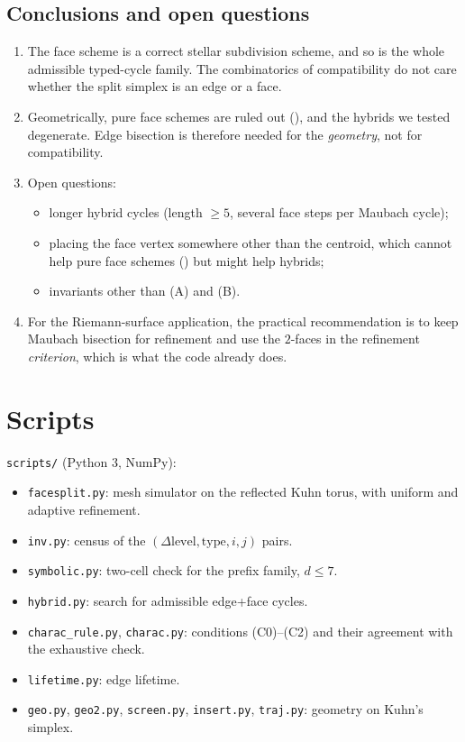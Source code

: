 \documentclass[11pt]{article}
\theoremstyle{plain}
\theoremstyle{definition}
\theoremstyle{remark}
\newcommand{\type}{\mathrm{type}}
\newcommand{\level}{\mathrm{level}}
\begin{document}
\subsection{Conclusions and open questions}

\begin{enumerate}
\item The face scheme is a correct stellar subdivision scheme, and so is
  the whole admissible typed-cycle family. The combinatorics of
  compatibility do not care whether the split simplex is an edge or a
  face.
\item Geometrically, pure face schemes are ruled out
  (), and the hybrids we tested degenerate. Edge
  bisection is therefore needed for the \emph{geometry}, not for
  compatibility.
\item Open questions:
  \begin{itemize}
  \item longer hybrid cycles (length $\ge5$, several face steps per
    Maubach cycle);
  \item placing the face vertex somewhere other than the centroid, which
    cannot help pure face schemes () but might help
    hybrids;
  \item invariants other than (A) and (B).
  \end{itemize}
\item For the Riemann-surface application, the practical recommendation
  is to keep Maubach bisection for refinement and use the $2$-faces in
  the refinement \emph{criterion}, which is what the code already does.
\end{enumerate}

\section*{Scripts}
\texttt{scripts/} (Python 3, NumPy):
\begin{itemize}
\item \texttt{facesplit.py}: mesh simulator on the reflected Kuhn torus,
  with uniform and adaptive refinement.
\item \texttt{inv.py}: census of the $(\Delta\level,\type,i,j)$ pairs.
\item \texttt{symbolic.py}: two-cell check for the prefix family, $d\le7$.
\item \texttt{hybrid.py}: search for admissible edge+face cycles.
\item \texttt{charac\_rule.py}, \texttt{charac.py}: conditions (C0)--(C2)
  and their agreement with the exhaustive check.
\item \texttt{lifetime.py}: edge lifetime.
\item \texttt{geo.py}, \texttt{geo2.py}, \texttt{screen.py}, \texttt{insert.py},
  \texttt{traj.py}: geometry on Kuhn's simplex.
\end{itemize}
\end{document}
